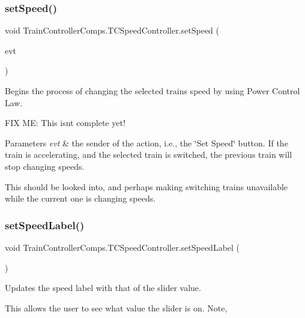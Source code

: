 \subsubsection{\texorpdfstring{set\+Speed()}{setSpeed()}}
{\footnotesize\ttfamily void Train\+Controller\+Comps.\+T\+C\+Speed\+Controller.\+set\+Speed (\begin{DoxyParamCaption}\item[{java.\+awt.\+event.\+Action\+Event}]{evt }\end{DoxyParamCaption})\hspace{0.3cm}{\ttfamily [private]}}



Begins the process of changing the selected train\textquotesingle{}s speed by using Power Control Law. 

F\+IX ME\+: This isn\textquotesingle{}t complete yet!


\begin{DoxyParams}{Parameters}
{\em evt} & the sender of the action, i.\+e., the \char`\"{}\+Set Speed\char`\"{} button.  If the train is accelerating, and the selected train is switched, the previous train will stop changing speeds.\\
\hline
\end{DoxyParams}
This should be looked into, and perhaps making switching trains unavailable while the current one is changing speeds. \mbox{\label{classTrainControllerComps_1_1TCSpeedController_afef25cbf49579c1ac17414ba29b30c13}} 
\subsubsection{\texorpdfstring{set\+Speed\+Label()}{setSpeedLabel()}}
{\footnotesize\ttfamily void Train\+Controller\+Comps.\+T\+C\+Speed\+Controller.\+set\+Speed\+Label (\begin{DoxyParamCaption}{ }\end{DoxyParamCaption})}



Updates the speed label with that of the slider value. 

This allows the user to see what value the slider is on. Note, \mbox{\label{classTrainControllerComps_1_1TCSpeedController_a5f707ae153cba07e276eab9c7fff7136}} 
